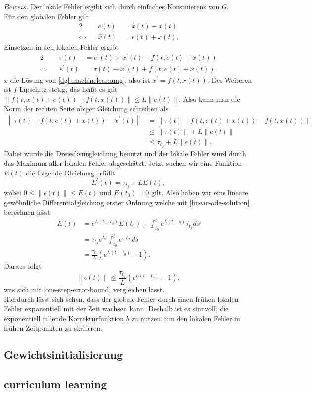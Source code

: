$Beweis.$ Der lokale Fehler ergibt sich durch einfaches Konstuierens von $G$.\\
Für den globalen Fehler gilt
\begin{alignat*}{2}
    &e(t) &= \hat{x}(t) - x(t)\\
    \Leftrightarrow \quad &\hat{x}(t) &= e(t) + x(t).
\end{alignat*}
Einsetzen in den lokalen Fehler ergibt
\begin{alignat*}{2}
    &\tau(t) &= e^{\prime}(t) + x^{\prime}(t) - f(t,e(t)+x(t))\\
    \Leftrightarrow \quad &e^{\prime}(t) &= \tau(t) - x^{\prime}(t) + f(t,e(t) + x(t)).
\end{alignat*}
$x$ die Lösung von \eqref{dgl-machinelearnung}, also ist $x^{\prime}=f(t,x(t))$. Des Weiteren ist $f$ Lipschitz-stetig,
das heißt es gilt $\left\lVert f(t,x(t)+e(t)) - f(t,x(t)) \right\rVert \leq L \left\lVert e(t) \right\rVert$. Also kann
man die Norm der rechten Seite obiger Gleichung schreiben als
\begin{align*}
    \left\lVert \tau(t) + f(t,e(t) + x(t)) - x^{\prime}(t) \right\rVert
    &= \left\lVert \tau(t) + f(t,e(t) + x(t)) - f(t,x(t)) \right\rVert \\
    &\leq \left\lVert \tau(t) \right\rVert + L\left\lVert e(t) \right\rVert \\
    &\leq \tau_{t_f} + L \left\lVert e(t) \right\rVert.
\end{align*}
Dabei wurde die Dreiecksungleichung benutzt und der lokale Fehler wurd durch das Maximum aller lokalen Fehler
abgeschätzt. Jetzt suchen wir eine Funktion $E(t)$ die folgende Gleichung erfüllt
\[
    E^{\prime}(t) = \tau_{t_f} + L E(t),
\]
wobei $0 \leq \left\lVert e(t) \right\rVert \leq E(t)$ und $E(t_0) = 0$ gilt. Also haben wir eine lineare gewöhnliche
Differentialgleichung erster Ordnung welche mit \eqref{linear-ode-solution} berechnen lässt
\begin{align*}
    E(t) &= e^{L(t-t_0)}E(t_0) + \int_{t_0}^{t}e^{L(t-s)}\tau_{t_f} ds \\
    &= \tau_{t_f} e^{Lt} \int_{t_0}^{t}e^{-Ls} ds \\
    &= \frac{\tau_{t_f} }{L} \left( e^{L(t-t_0)} - 1 \right).
\end{align*}
Daraus folgt
\[
    \left\lVert e(t) \right\rVert \leq \frac{\tau_{t_f}}{L} \left( e^{L(t-t_0)} - 1 \right),
\]
was sich mit \eqref{one-step-error-bound} vergleichen lässt. \qedwhite\\
Hierdurch lässt sich sehen, dass der globale Fehler durch einen frühen lokalen Fehler exponentiell mit der Zeit wachsen
kann. Deshalb ist es sinnvoll, die exponentiell fallende Korrekturfunktion $b$ zu nutzen, um den lokalen Fehler in
frühen Zeitpunkten zu skalieren.

\subsection{Gewichtsinitialisierung}
\label{subsec:gewichtsinitialisierung}


\subsection{curriculum learning}
\label{subsec:curriculum-learning}